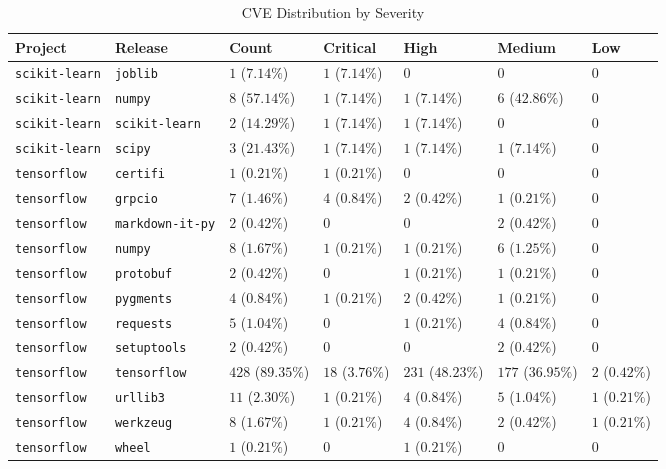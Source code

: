 \begin{table}
\caption{CVE Distribution by Severity}
\label{tab:cve-distribution}
\begin{tabular}{lllllll}
\toprule
Project & Release & Count & Critical & High & Medium & Low \\
\midrule
\texttt{scikit-learn} & \texttt{joblib} & $1$ ($7.14\%$) & $1$ ($7.14\%$) & $0$ & $0$ & $0$ \\
\texttt{scikit-learn} & \texttt{numpy} & $8$ ($57.14\%$) & $1$ ($7.14\%$) & $1$ ($7.14\%$) & $6$ ($42.86\%$) & $0$ \\
\texttt{scikit-learn} & \texttt{scikit-learn} & $2$ ($14.29\%$) & $1$ ($7.14\%$) & $1$ ($7.14\%$) & $0$ & $0$ \\
\texttt{scikit-learn} & \texttt{scipy} & $3$ ($21.43\%$) & $1$ ($7.14\%$) & $1$ ($7.14\%$) & $1$ ($7.14\%$) & $0$ \\
\texttt{tensorflow} & \texttt{certifi} & $1$ ($0.21\%$) & $1$ ($0.21\%$) & $0$ & $0$ & $0$ \\
\texttt{tensorflow} & \texttt{grpcio} & $7$ ($1.46\%$) & $4$ ($0.84\%$) & $2$ ($0.42\%$) & $1$ ($0.21\%$) & $0$ \\
\texttt{tensorflow} & \texttt{markdown-it-py} & $2$ ($0.42\%$) & $0$ & $0$ & $2$ ($0.42\%$) & $0$ \\
\texttt{tensorflow} & \texttt{numpy} & $8$ ($1.67\%$) & $1$ ($0.21\%$) & $1$ ($0.21\%$) & $6$ ($1.25\%$) & $0$ \\
\texttt{tensorflow} & \texttt{protobuf} & $2$ ($0.42\%$) & $0$ & $1$ ($0.21\%$) & $1$ ($0.21\%$) & $0$ \\
\texttt{tensorflow} & \texttt{pygments} & $4$ ($0.84\%$) & $1$ ($0.21\%$) & $2$ ($0.42\%$) & $1$ ($0.21\%$) & $0$ \\
\texttt{tensorflow} & \texttt{requests} & $5$ ($1.04\%$) & $0$ & $1$ ($0.21\%$) & $4$ ($0.84\%$) & $0$ \\
\texttt{tensorflow} & \texttt{setuptools} & $2$ ($0.42\%$) & $0$ & $0$ & $2$ ($0.42\%$) & $0$ \\
\texttt{tensorflow} & \texttt{tensorflow} & $428$ ($89.35\%$) & $18$ ($3.76\%$) & $231$ ($48.23\%$) & $177$ ($36.95\%$) & $2$ ($0.42\%$) \\
\texttt{tensorflow} & \texttt{urllib3} & $11$ ($2.30\%$) & $1$ ($0.21\%$) & $4$ ($0.84\%$) & $5$ ($1.04\%$) & $1$ ($0.21\%$) \\
\texttt{tensorflow} & \texttt{werkzeug} & $8$ ($1.67\%$) & $1$ ($0.21\%$) & $4$ ($0.84\%$) & $2$ ($0.42\%$) & $1$ ($0.21\%$) \\
\texttt{tensorflow} & \texttt{wheel} & $1$ ($0.21\%$) & $0$ & $1$ ($0.21\%$) & $0$ & $0$ \\
\bottomrule
\end{tabular}
\end{table}
